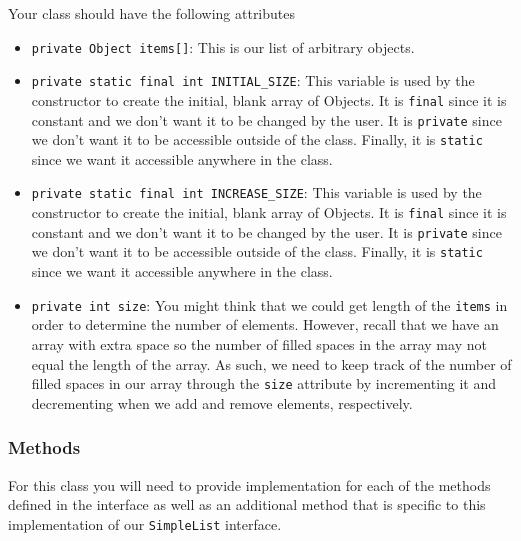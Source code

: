 \documentclass[a4paper]{article}
\begin{document}
Your class should have the following attributes
\begin{itemize}
	\item \lstinline|private Object items[]|: This is our list of arbitrary objects. 
	\item \lstinline|private static final int INITIAL_SIZE|: This variable is used by the constructor to create the initial, blank array of Objects. It is \lstinline|final| since it is constant and we don't want it to be changed by the user. It is \lstinline|private| since we don't want it to be accessible outside of the class. Finally, it is \lstinline|static| since we want it accessible anywhere in the class.
	\item \lstinline|private static final int INCREASE_SIZE|: This variable is used by the constructor to create the initial, blank array of Objects. It is \lstinline|final| since it is constant and we don't want it to be changed by the user. It is \lstinline|private| since we don't want it to be accessible outside of the class. Finally, it is \lstinline|static| since we want it accessible anywhere in the class.
	\item \lstinline|private int size|: You might think that we could get length of the \lstinline|items| in order to determine the number of elements. However, recall that we have an array with extra space so the number of filled spaces in the array may not equal the length of the array. As such, we need to keep track of the number of filled spaces in our array through the \lstinline|size| attribute by incrementing it and decrementing when we add and remove elements, respectively.
\end{itemize}

\subsubsection*{Methods}

For this class you will need to provide implementation for each of the methods
defined in the interface as well as an additional method that is specific to
this implementation of our \lstinline|SimpleList| interface.
\end{document}
